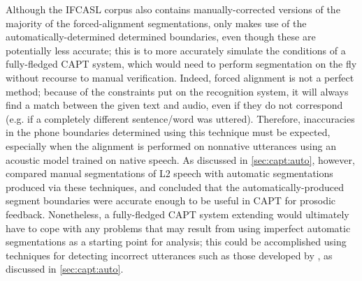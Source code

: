 	
	
	Although the IFCASL corpus also contains manually-corrected versions of the majority of the forced-alignment segmentations,
	 only makes use of the automatically-determined determined boundaries, even though these are potentially less accurate; 
	this is to more accurately 
	simulate the conditions of a 
	fully-fledged CAPT system,
	which 
	would need to perform segmentation on the fly without recourse to manual verification.
	Indeed, 
	forced alignment is not a perfect method; because of the constraints put on the recognition system, it will always find a match between the given text and audio, even if they do not correspond (e.g. if a completely different sentence/word was uttered).  
	Therefore, inaccuracies in the phone boundaries determined using this technique must be expected, especially when the alignment is performed on nonnative utterances using an acoustic model trained on native speech.
	As discussed in \cref{sec:capt:auto}, however, \textcite{Mesbahi2011} compared manual segmentations of L2 speech with automatic segmentations produced via these techniques, and concluded that the automatically-produced segment boundaries were accurate enough to be useful in CAPT for prosodic feedback.
		Nonetheless, a fully-fledged CAPT system extending  would ultimately have to cope with any problems that may result from using imperfect automatic segmentations as a starting point for analysis; this could be accomplished using techniques for detecting incorrect utterances such as those developed by \textcite{Bonneau2012,Orosanu2012}, as discussed in \cref{sec:capt:auto}.
	
